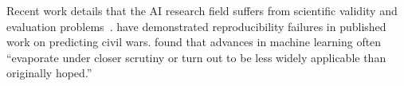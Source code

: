\documentclass[acmconf,manuscript,screen,natbib=true]{acmart}
\begin{document}







Recent work details 
that the AI research field suffers from scientific validity and evaluation problems~\cite{haibe_kains, mit_replication}.
\citet{kapoor_irreproducible_2021} have demonstrated 
reproducibility failures in published work on predicting civil wars. 
\citet{LiaoAreWe2021} found that 
advances in machine learning often ``evaporate under closer scrutiny or turn out to be less widely applicable than originally hoped.''
\end{document}
